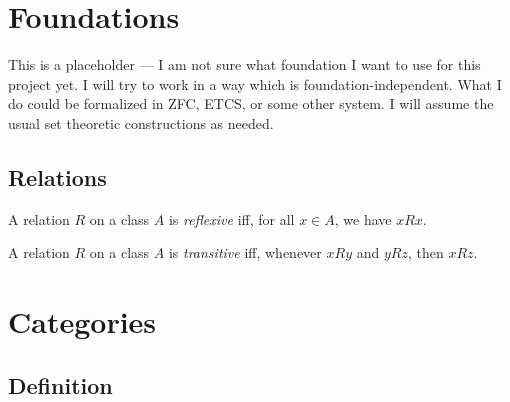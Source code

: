 \newcommand{\dom}{\ensuremath{\operatorname{dom}}}
\newcommand{\cod}{\ensuremath{\operatorname{cod}}}
\newcommand{\Cat}{\ensuremath{\mathbf{Cat}}}

\chapter{Foundations}

This is a placeholder --- I am not sure what foundation I want to use for this
project yet. I will try to work in a way which is foundation-independent. What
I do could be formalized in ZFC, ETCS, or some other system. I will assume the
usual set theoretic constructions as needed. 

\section{Relations}

\begin{df}[Reflexive]
A relation $R$ on a class $A$ is \emph{reflexive} iff, for all $x \in A$, we have $xRx$.
\end{df}

\begin{df}[Transitive]
A relation $R$ on a class $A$ is \emph{transitive} iff, whenever $xRy$ and $yRz$, then $xRz$.
\end{df}

\chapter{Categories}

\section{Definition}

